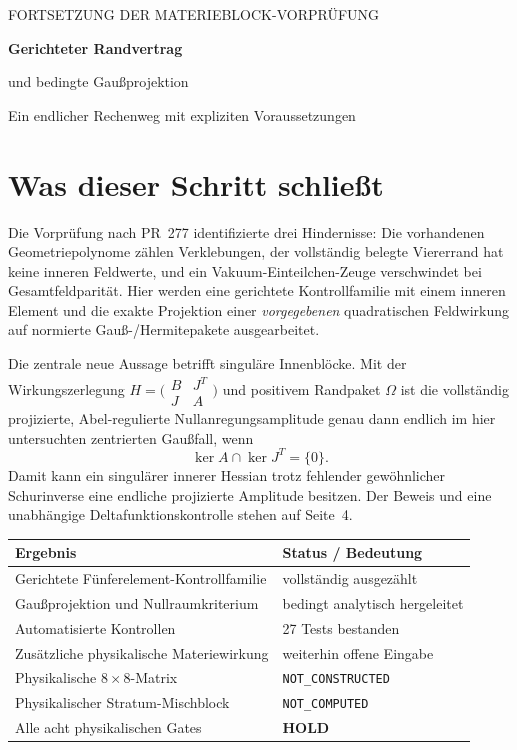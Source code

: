 \documentclass[10pt,a4paper]{article}
\newcommand{\status}[1]{\textsf{\textbf{#1}}}
\newcommand{\sect}[1]{\section*{\color{navy}#1}}
\begin{document}
{\sffamily\small\color{teal}FORTSETZUNG DER MATERIEBLOCK-VORPRÜFUNG}
\vspace{5mm}

{\sffamily\bfseries\color{navy}\LARGE Gerichteter Randvertrag\par und bedingte Gaußprojektion\par}
\vspace{3mm}
{\large Ein endlicher Rechenweg mit expliziten Voraussetzungen\par}

\sect{Was dieser Schritt schließt}
Die Vorprüfung nach PR~277 identifizierte drei Hindernisse: Die vorhandenen
Geometriepolynome zählen Verklebungen, der vollständig belegte Viererrand hat
keine inneren Feldwerte, und ein Vakuum-Einteilchen-Zeuge verschwindet bei
Gesamtfeldparität. Hier werden eine gerichtete Kontrollfamilie mit einem
inneren Element und die exakte Projektion einer \emph{vorgegebenen}
quadratischen Feldwirkung auf normierte Gauß-/Hermitepakete ausgearbeitet.

Die zentrale neue Aussage betrifft singuläre Innenblöcke. Mit der
Wirkungszerlegung $H=\bigl(\begin{smallmatrix}B&J^T\\J&A\end{smallmatrix}\bigr)$
und positivem Randpaket $\Omega$ ist die vollständig projizierte,
Abel-regulierte Nullanregungsamplitude genau dann endlich im hier untersuchten
zentrierten Gaußfall, wenn
\[
\boxed{\ker A\cap\ker J^T=\{0\}.}
\]
Damit kann ein singulärer innerer Hessian trotz fehlender gewöhnlicher
Schurinverse eine endliche projizierte Amplitude besitzen. Der Beweis und eine
unabhängige Deltafunktionskontrolle stehen auf Seite~4.

\begin{center}
\begin{tabular}{p{.49\linewidth}p{.40\linewidth}}
\toprule
Ergebnis & Status / Bedeutung\\\midrule
Gerichtete Fünferelement-Kontrollfamilie & vollständig ausgezählt\\
Gaußprojektion und Nullraumkriterium & bedingt analytisch hergeleitet\\
Automatisierte Kontrollen & 27 Tests bestanden\\
Zusätzliche physikalische Materiewirkung & weiterhin offene Eingabe\\
Physikalische $8\times8$-Matrix & \texttt{NOT\_CONSTRUCTED}\\
Physikalischer Stratum-Mischblock & \texttt{NOT\_COMPUTED}\\
Alle acht physikalischen Gates & \status{HOLD}\\\bottomrule
\end{tabular}
\end{center}
\end{document}
